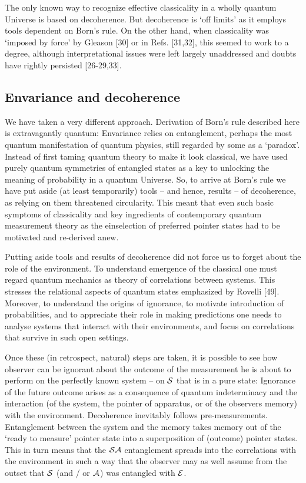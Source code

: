 \documentclass[aps,twocolumn,pra,epsfig]{revtex4}
\begin{document}
The only known way to recognize effective classicality in a wholly 
quantum Universe is based on decoherence. But decoherence is 
`off limits' as it employs tools dependent on Born's rule. On the 
other hand, when classicality was `imposed by force' by Gleason [30] 
or in Refs. [31,32], this seemed to work to a degree, although 
interpretational issues were left largely unaddressed and doubts 
have rightly persisted [26-29,33].

\subsection{Envariance and decoherence}

We have taken a very different approach. Derivation of Born's rule described
here is extravagantly quantum: Envariance relies on entanglement, perhaps
the most quantum manifestation of quantum physics, still regarded by some as
a `paradox'. Instead of first taming quantum theory to make it look classical, 
we have used purely quantum symmetries of entangled states as a key 
to unlocking the meaning of probability in a quantum Universe. So, to
arrive at Born's rule we have put aside (at least temporarily) tools -- and
hence, results -- of decoherence, as relying on them threatened circularity. 
This meant that even such basic symptoms of classicality and key ingredients 
of contemporary quantum measurement theory as the einselection of preferred
pointer states had to be motivated and re-derived anew.

Putting aside tools and results of decoherence did not force us to forget about
the role of the environment. To understand emergence of the classical one must
regard quantum mechanics as theory of correlations between systems. This 
stresses the relational aspects of quantum states emphasized
by Rovelli [49]. Moreover, to understand the origins of ignorance, to motivate 
introduction of probabilities, and to appreciate their role in making predictions
one needs to analyse systems that interact with their environments, and focus
on correlations that survive in such open settings.

Once these (in retrospect, natural) steps are taken, it is possible to see how 
observer can be ignorant about the outcome of the measurement he is about
to perform on the perfectly known system -- on ${\cal S}$ that is in a pure state:
Ignorance of the future outcome arises as a consequence of quantum 
indeterminacy and the interaction (of the system, the pointer of apparatus, or of
the observers memory) with the environment. Decoherence inevitably follows
pre-measurements. Entanglement between the system and the memory takes memory
out of the `ready to measure' pointer state into a superposition of (outcome)
pointer states. This in turn means that the ${\cal SA}$ entanglement spreads
into the correlations with the environment in such a way that the observer may
as well assume from the outset that ${\cal S}$ (and / or ${\cal A}$) was
entangled with ${\cal E}$.
\end{document}
